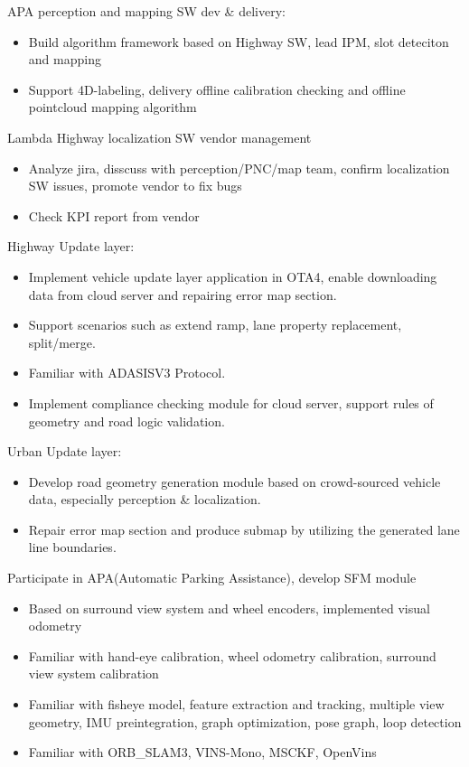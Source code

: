 \documentclass{resume}
\begin{document}
APA perception and mapping SW dev \& delivery:
\begin{itemize}
  \item Build algorithm framework based on Highway SW, lead IPM, slot deteciton and mapping
  \item Support 4D-labeling, delivery offline calibration checking and offline pointcloud mapping algorithm
\end{itemize}

Lambda  Highway localization SW vendor management
\begin{itemize}
  \item Analyze jira, disscuss with perception/PNC/map team, confirm localization SW issues, promote vendor to fix bugs
  \item Check KPI report from vendor
\end{itemize}

Highway Update layer:
\begin{itemize}
  \item Implement vehicle update layer application in OTA4, enable downloading data from cloud server and repairing error map section.
  \item Support scenarios such as extend ramp, lane property replacement, split/merge.
  \item Familiar with ADASISV3 Protocol.
  \item Implement compliance checking module for cloud server, support rules of geometry and road logic validation.
\end{itemize}

Urban Update layer:
\begin{itemize}
  \item Develop road geometry generation module based on crowd-sourced vehicle data, especially perception \& localization.
  \item Repair error map section and produce submap by utilizing the generated lane line boundaries.
\end{itemize}



Participate in APA(Automatic Parking Assistance), develop SFM module
\begin{itemize}
  \item Based on surround view system and wheel encoders, implemented visual odometry
  \item Familiar with hand-eye calibration, wheel odometry calibration, surround view system calibration
  \item Familiar with fisheye model, feature extraction and tracking, multiple view geometry, IMU preintegration, graph optimization, pose graph, loop detection
  \item Familiar with ORB\_SLAM3, VINS-Mono, MSCKF, OpenVins
\end{itemize}
\end{document}
